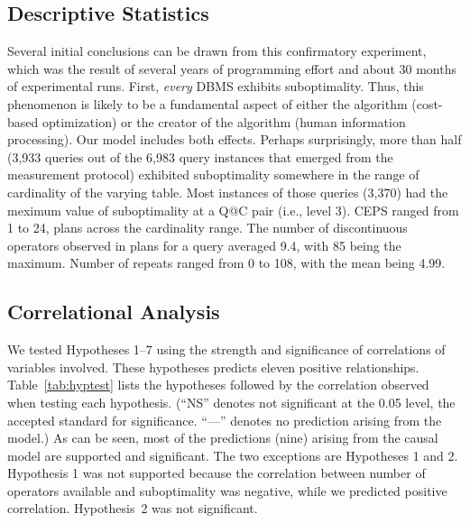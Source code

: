 \documentclass[prodmode,acmtods]{acmsmall}
\begin{document}
\subsection{Descriptive Statistics}
Several initial conclusions can be drawn from this confirmatory experiment, which was the
result of several years of programming effort and about 30 months of
experimental runs. First, {\em every} \hbox{DBMS} exhibits suboptimality. Thus, this
phenomenon is likely to be a fundamental aspect of either the algorithm
(cost-based optimization) or the creator of the algorithm (human information
processing). Our model includes both effects. Perhaps surprisingly, 
more than half (3,933 queries out of the 6,983  
query instances that emerged from the measurement protocol) exhibited suboptimality
somewhere in the range of cardinality of the varying table. 
Most instances of those queries (3,370) had the meximum value of suboptimality at a Q@C pair (i.e., level 3). 
CEPS ranged from 1 to 24,
plans across the cardinality range. The number of discontinuous operators observed in plans for a query
averaged 9.4, with 85 being the maximum. Number of repeats ranged from 0 to 108, with the mean being 4.99.

 
\subsection{Correlational Analysis}
We tested Hypotheses 1--7 using the strength and significance of correlations
of variables involved. These hypotheses 
predicts eleven positive relationships. Table~\ref{tab:hyptest} lists the hypotheses followed by the
correlation observed when testing each hypothesis.  (``NS'' denotes not
significant at the 0.05 level, the accepted standard for
significance. ``---'' denotes no prediction arising from the model.) As can
be seen, most of the predictions (nine) arising from the causal model are
supported and significant.  The two
exceptions are Hypotheses 1 and 2. Hypothesis 1 was not supported because
the correlation between number of operators available and suboptimality was negative,
while we predicted positive correlation.  \hbox{Hypothesis}~2 was not significant.
\end{document}
